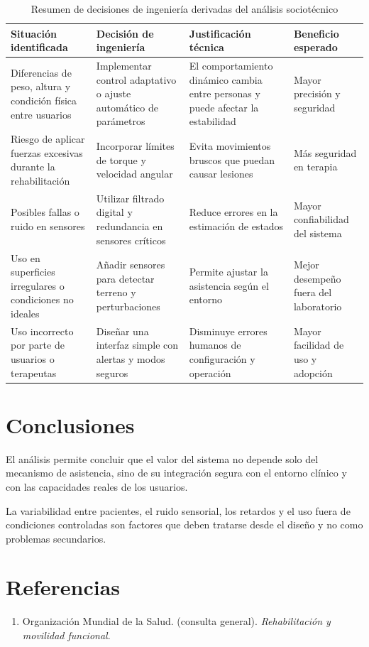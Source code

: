 \documentclass[letterpaper,12pt]{article}
\begin{document}
\begin{table}[H]
    \centering
    \caption{Resumen de decisiones de ingeniería derivadas del análisis sociotécnico}
    \begin{tabular}{>{\raggedright\arraybackslash}p{4cm} >{\raggedright\arraybackslash}p{4.3cm} >{\raggedright\arraybackslash}p{4.3cm} >{\raggedright\arraybackslash}p{3.4cm}}
        \toprule
        \textbf{Situación identificada} & \textbf{Decisión de ingeniería} & \textbf{Justificación técnica} & \textbf{Beneficio esperado} \\
        \midrule
        Diferencias de peso, altura y condición física entre usuarios & Implementar control adaptativo o ajuste automático de parámetros & El comportamiento dinámico cambia entre personas y puede afectar la estabilidad & Mayor precisión y seguridad \\
        Riesgo de aplicar fuerzas excesivas durante la rehabilitación & Incorporar límites de torque y velocidad angular & Evita movimientos bruscos que puedan causar lesiones & Más seguridad en terapia \\
        Posibles fallas o ruido en sensores & Utilizar filtrado digital y redundancia en sensores críticos & Reduce errores en la estimación de estados & Mayor confiabilidad del sistema \\
        Uso en superficies irregulares o condiciones no ideales & Añadir sensores para detectar terreno y perturbaciones & Permite ajustar la asistencia según el entorno & Mejor desempeño fuera del laboratorio \\
        Uso incorrecto por parte de usuarios o terapeutas & Diseñar una interfaz simple con alertas y modos seguros & Disminuye errores humanos de configuración y operación & Mayor facilidad de uso y adopción \\
        \bottomrule
    \end{tabular}
\end{table}

\section{Conclusiones}

El análisis permite concluir que el valor del sistema no depende solo del mecanismo de asistencia, sino de su integración segura con el entorno clínico y con las capacidades reales de los usuarios.

La variabilidad entre pacientes, el ruido sensorial, los retardos y el uso fuera de condiciones controladas son factores que deben tratarse desde el diseño y no como problemas secundarios.

\section*{Referencias}

\begin{enumerate}
    \item Organización Mundial de la Salud. (consulta general). \textit{Rehabilitación y movilidad funcional}.
\end{enumerate}
\end{document}
